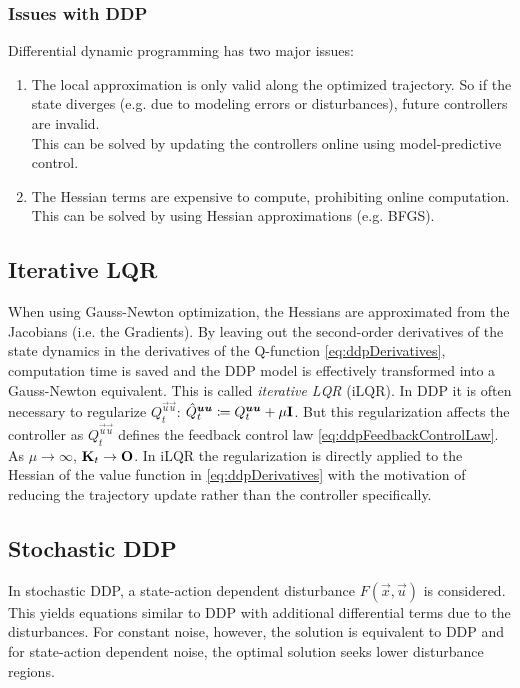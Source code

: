 			\subsubsection{Issues with DDP}
				Differential dynamic programming has two major issues:
				\begin{enumerate}
					\item The local approximation is only valid along the optimized trajectory. So if the state diverges (e.g. due to modeling errors or disturbances), future controllers are invalid. \\
						This can be solved by updating the controllers online using model-predictive control.
					\item The Hessian terms are expensive to compute, prohibiting online computation. \\
						This can be solved by using Hessian approximations (e.g. BFGS).
				\end{enumerate}

		\subsection{Iterative LQR}
			When using Gauss-Newton optimization, the Hessians are approximated from the Jacobians (i.e. the Gradients). By leaving out the second-order derivatives of the state dynamics in the derivatives of the Q-function \eqref{eq:ddpDerivatives}, computation time is saved and the DDP model is effectively transformed into a Gauss-Newton equivalent. This is called \emph{iterative LQR} (iLQR). In DDP it is often necessary to regularize \( Q_t^{\vec{u} \vec{u}} \): \( \hat{Q}_t^{\bm{u} \bm{u}} \coloneqq Q_t^{\bm{u} \bm{u}} + \mu \bm{\mathrm{I}} \). But this regularization affects the controller as \( Q_t^{\vec{u} \vec{u}} \) defines the feedback control law \eqref{eq:ddpFeedbackControlLaw}. As \( \mu \to \infty \), \( \bm{\mathrm{K}}_t \to \bm{\mathrm{O}} \). In iLQR the regularization is directly applied to the Hessian of the value function in \eqref{eq:ddpDerivatives} with the motivation of reducing the trajectory update rather than the controller specifically.

		\subsection{Stochastic DDP}
			In stochastic DDP, a state-action dependent disturbance \( F(\vec{x}, \vec{u}) \) is considered. This yields equations similar to DDP with additional differential terms due to the disturbances. For constant noise, however, the solution is equivalent to DDP and for state-action dependent noise, the optimal solution seeks lower disturbance regions.

